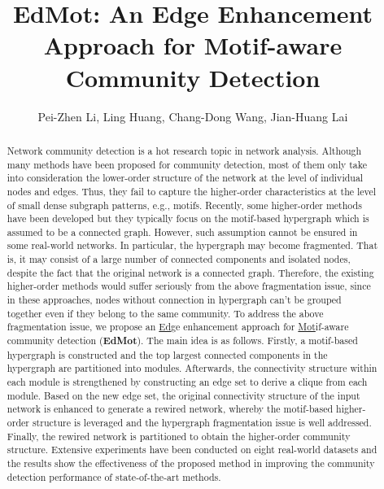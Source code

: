 \documentclass[sigconf]{acmart}
\begin{document}

\title{EdMot: An Edge Enhancement Approach for Motif-aware Community Detection}

\author{Pei-Zhen Li, Ling Huang, Chang-Dong Wang, Jian-Huang Lai}






\begin{abstract}
Network community detection is a hot research topic in network analysis. Although many methods have been proposed for community detection, most of them only take into consideration the lower-order structure of the network at the level of individual nodes and edges. Thus, they fail to capture the higher-order characteristics at the level of small dense subgraph patterns, e.g., motifs. Recently, some higher-order methods have been developed but they typically focus on the motif-based hypergraph which is assumed to be a connected graph. However, such assumption cannot be ensured in some real-world networks. In particular, the hypergraph may become fragmented. That is, it may consist of a large number of connected components and isolated nodes, despite the fact that the original network is a connected graph.
Therefore, the existing higher-order methods would suffer seriously from the above fragmentation issue, since in these approaches, nodes without connection in hypergraph can't be grouped together even if they belong to the same community. To address the above fragmentation issue, we propose an \underline{Ed}ge enhancement approach for \underline{Mot}if-aware community detection (\textbf{EdMot}). The main idea is as follows. Firstly, a motif-based hypergraph is constructed and the top  largest connected components in the hypergraph are partitioned into modules. Afterwards, the connectivity structure within each module is strengthened by constructing an edge set to derive a clique from each module. Based on the new edge set, the original connectivity structure of the input network is enhanced to generate a rewired network, whereby the motif-based higher-order structure is leveraged and the hypergraph fragmentation issue is well addressed. Finally, the rewired network is partitioned to obtain the higher-order community structure.
Extensive experiments have been conducted on eight real-world datasets and the results show the effectiveness of the proposed method in improving the community detection performance of state-of-the-art methods.
\end{abstract}
\end{document}
